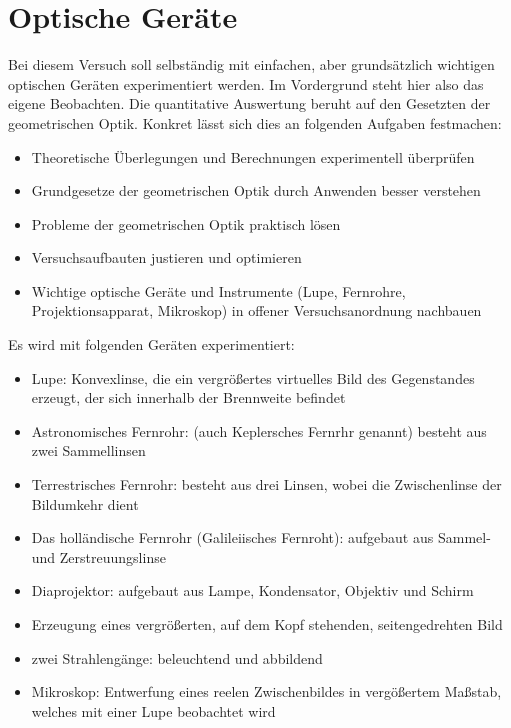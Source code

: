 \chapter{Optische Geräte}
Bei diesem Versuch soll selbständig mit einfachen, aber grundsätzlich wichtigen optischen Geräten experimentiert werden. Im Vordergrund steht hier also das eigene Beobachten. Die quantitative Auswertung beruht auf den Gesetzten der geometrischen Optik. Konkret lässt sich dies an folgenden Aufgaben festmachen:
\begin{itemize}
 \item  Theoretische Überlegungen und Berechnungen experimentell überprüfen
 \item Grundgesetze der geometrischen Optik durch Anwenden besser verstehen
 \item  Probleme der geometrischen Optik praktisch lösen
 \item  Versuchsaufbauten justieren und optimieren
 \item Wichtige optische Geräte und Instrumente (Lupe, Fernrohre, Projektionsapparat, Mikroskop)
 in offener Versuchsanordnung nachbauen
\end{itemize}
Es wird mit folgenden Geräten experimentiert:
\begin{itemize}
 \item Lupe: Konvexlinse, die ein vergrößertes virtuelles Bild des Gegenstandes erzeugt, der sich innerhalb der Brennweite befindet
 \item Astronomisches Fernrohr: (auch Keplersches Fernrhr genannt) besteht aus zwei Sammellinsen
 \item Terrestrisches Fernrohr: besteht aus drei Linsen, wobei die Zwischenlinse der Bildumkehr dient
 \item Das holländische Fernrohr (Galileiisches Fernroht): aufgebaut aus Sammel- und Zerstreuungslinse
 \item Diaprojektor: aufgebaut aus Lampe, Kondensator, Objektiv und Schirm
 \item Erzeugung eines vergrößerten, auf dem Kopf stehenden, seitengedrehten Bild
 \item zwei Strahlengänge: beleuchtend und abbildend
 \item Mikroskop: Entwerfung eines reelen Zwischenbildes in vergößertem Maßstab, welches mit einer Lupe beobachtet wird
\end{itemize}
\newpage
